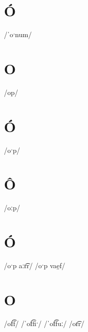 \documentclass[10pt,a4paper,twoside]{book}
\begin{document}
\section*{Ó}

\begin{multicols}{3}
 {/ˈoˑnum/} {}
\end{multicols}

\section*{O}

\begin{multicols}{3}
 {/op/} {}
\end{multicols}

\section*{Ó}

\begin{multicols}{3}
 {/oˑp/} {}
\end{multicols}

\section*{Ô}

\begin{multicols}{3}
 {/oːp/} {}
\end{multicols}

\section*{Ó}

\begin{multicols}{3}
 {/oˑp aːr͡r/} {}
 {/oˑp vae̯f/} {}
\end{multicols}

\section*{O}

\begin{multicols}{3}
 {/of͡f/} {}
 {/ˈof͡fiˑ/} {}
 {/ˈof͡fuː/} {}
 {/or͡r/} {}
\end{multicols}
\end{document}
